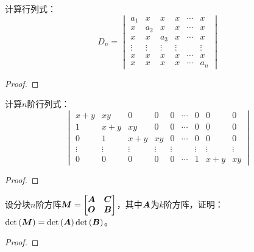 \begin{problem}
计算行列式：
\begin{equation*}
    D_n=
    \begin{vmatrix}
        a_1    & x      & x      & x      & \cdots & x      \\
        x      & a_2    & x      & x      & \cdots & x      \\
        x      & x      & a_3    & x      & \cdots & x      \\
        \vdots & \vdots & \vdots & \vdots &        & \vdots \\
        x      & x      & x      & x      & \cdots & x      \\
        x      & x      & x      & x      & \cdots & a_n
    \end{vmatrix}
\end{equation*}
\end{problem}
\begin{proof}
\end{proof}

\begin{problem}
计算\(n\)阶行列式：
\begin{equation*}
    \begin{vmatrix}
        x+y    & xy     & 0      & 0      & 0      & \cdots & 0      & 0      & 0      \\
        1      & x+y    & xy     & 0      & 0      & \cdots & 0      & 0      & 0      \\
        0      & 1      & x+y    & xy     & 0      & \cdots & 0      & 0      & 0      \\
        \vdots & \vdots & \vdots & \vdots & \vdots &        & \vdots & \vdots & \vdots \\
        0      & 0      & 0      & 0      & 0      & \cdots & 1      & x+y    & xy
    \end{vmatrix}
\end{equation*}
\end{problem}
\begin{proof}
\end{proof}

\begin{problem}
设分块\(n\)阶方阵\(\boldsymbol{M}=\begin{bmatrix}\boldsymbol{A}&\boldsymbol{C}\\\boldsymbol{O}&\boldsymbol{B}\end{bmatrix}\)，其中\(\boldsymbol{A}\)为\(k\)阶方阵，证明：\(\mathrm{det}\left( \boldsymbol{M} \right)=\mathrm{det}\left( \boldsymbol{A} \right)\mathrm{det}\left( \boldsymbol{B} \right)\)。
\end{problem}
\begin{proof}
\end{proof}

